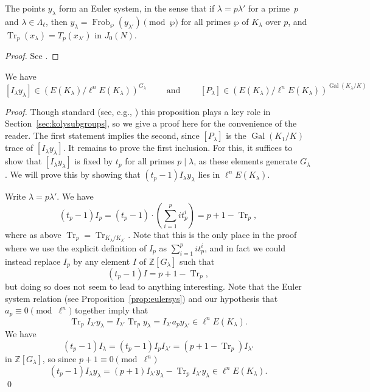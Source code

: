 \documentclass{oupau}
\DeclareMathOperator{\Frob}{Frob}
\DeclareMathOperator{\Gal}{Gal}
\DeclareMathOperator{\Tr}{Tr}
\newcommand{\ZZ}{\mathbb{Z}}
\begin{document}
\begin{proposition}\label{prop:eulersys}
  The points $y_{\lambda}$ form an Euler system, in the sense that if
  $\lambda = p \lambda'$ for a prime~$p$ and $\lambda \in
  \Lambda_{\ell}$, then $ y_{\lambda} = \Frob_{\wp}(y_{\lambda'})
  \pmod{\wp} $ for all primes $\wp$ of $K_{\lambda}$ over $p$, and
  $\Tr_p(x_{\lambda}) = T_p (x_{\lambda'}) $ in $J_0(N)$.
\end{proposition}
\begin{proof}
See \cite[Prop.~3.7]{gross:kolyvagin}.
\end{proof}


\begin{proposition}\label{prop:invariant}
We have
$$
  [I_{\lambda} y_{\lambda}] \in (E(K_{\lambda}) / {\ell^n} E(K_{\lambda}))^{G_{\lambda}}
\qquad\text{ and }
\qquad 
  [P_{\lambda}] \in (E(K_{\lambda}) / {\ell^n} E(K_{\lambda}))^{\Gal(K_{\lambda}/K)}
$$
\end{proposition}
\begin{proof}
  Though standard (see, e.g., \cite[Prop.~3.6]{gross:kolyvagin}) this
  proposition plays a key role in Section~\ref{sec:kolysubgroups}, so
  we give a proof here for the convenience of the reader.  The first
  statement implies the second, since $[P_{\lambda}]$ is the
  $\Gal(K_{1}/K)$ trace of $[I_{\lambda} y_{\lambda}]$.  It remains to
  prove the first inclusion. For this, it suffices to show that
  $[I_{\lambda} y_{\lambda}]$ is fixed by $t_p$ for all primes $p\mid \lambda$, as
  these elements generate $G_{\lambda}$.  We will prove this by
  showing that $(t_p - 1) I_{\lambda} y_{\lambda}$ lies in ${\ell^n}
  E(K_{\lambda})$.

Write $\lambda = p \lambda'$.  We have
\begin{equation}\label{iprel}
 (t_p - 1) I_p =  (t_p - 1) \cdot \left(\sum_{i=1}^p i t_p^i\right)
               = p + 1 - \Tr_p,
\end{equation}
where as above $\Tr_p = \Tr_{K_{\lambda}/K_{\lambda'}}$.
Note that this is the only place in the proof where we use the explicit
definition of $I_p$ as $\sum_{i=1}^p i t_p^i$, and in fact
we could instead replace $I_p$ by any element $I$ of $\ZZ[G_{\lambda}]$
such that 
$$
(t_p - 1) I = p + 1 - \Tr_p,
$$
but doing so does not seem to lead to anything interesting.
Note that the Euler system relation (see Proposition~\ref{prop:eulersys})
and our hypothesis that $a_p \equiv 0 \pmod{{\ell^n}}$ together
imply that
$$
 \Tr_{p} I_{\lambda'} y_{\lambda} = I_{\lambda'} \Tr_{p} y_{\lambda}= I_{\lambda'} a_p y_{\lambda'} \in {\ell^n} E(K_{\lambda}).
$$ 
We have
$$
  (t_p  - 1) I_{\lambda} = (t_p - 1) I_{p} I_{\lambda'}
                         = (p + 1 - \Tr_p) I_{\lambda'}
$$
in $\ZZ[G_{\lambda}]$, so since $p+1\equiv 0 \pmod{{\ell^n}}$
$$
  (t_p - 1) I_{\lambda} y_{\lambda} 
     = (p + 1) I_{\lambda'} y_{\lambda} - \Tr_p I_{\lambda'} y_{\lambda}
     \in \ell^n E(K_{\lambda}).
$$
\qed\end{proof}
\end{document}
